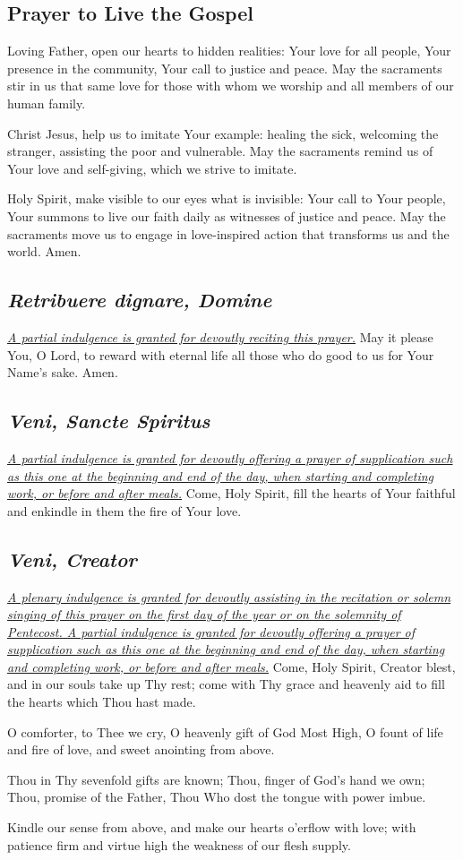 \documentclass[12pt]{article}
\newcommand{\prayertitle}[1]{\subsection{#1}}
\newcommand{\indulgencedprayertitle}[1]{\prayertitle{#1 \protect\kreuz}}
\newcommand{\foreign}[1]{\textsl{#1}}
\newcommand{\note}[1]{{\small{\textsl{#1}}}\newline}
\newcommand{\linkednote}[2]{\hyperlink{#1}{\note{#2}}}
\begin{document}
\prayertitle{Prayer to Live the Gospel}
Loving Father, open our hearts to hidden realities:
Your love for all people,
Your presence in the community,
Your call to justice and peace.
May the sacraments stir in us
that same love for those with whom we worship and all members of our human family.

Christ Jesus, help us to imitate Your example:
healing the sick,
welcoming the stranger,
assisting the poor and vulnerable.
May the sacraments remind us
of Your love and self-giving,
which we strive to imitate.

Holy Spirit, make visible to our eyes what is invisible:
Your call to Your people,
Your summons to live our faith daily
as witnesses of justice and peace.
May the sacraments move us to engage in love-inspired action that transforms us and the world.
Amen.

\indulgencedprayertitle{\foreign{Retribuere dignare, Domine}}
\linkednote{grant24}{A partial indulgence is granted for devoutly reciting this prayer.}
May it please You, O Lord, to reward with eternal life all those who do good to us for Your Name's sake. Amen.

\indulgencedprayertitle{\foreign{Veni, Sancte Spiritus}}
\linkednote{grant26}{A partial indulgence is granted for devoutly offering a prayer of supplication such as this one at the beginning and end of the day, when starting and completing work, or before and after meals.}
Come, Holy Spirit, fill the hearts of Your faithful and enkindle in them the fire of Your love.

\indulgencedprayertitle{\foreign{Veni, Creator}}
\linkednote{grant26}{A plenary indulgence is granted for devoutly assisting in the recitation or solemn singing of this prayer on the first day of the year or on the solemnity of Pentecost.
A partial indulgence is granted for devoutly offering a prayer of supplication such as this one at the beginning and end of the day, when starting and completing work, or before and after meals.}
Come, Holy Spirit, Creator blest,
and in our souls take up Thy rest;
come with Thy grace and heavenly aid
to fill the hearts which Thou hast made.

O comforter, to Thee we cry,
O heavenly gift of God Most High,
O fount of life and fire of love,
and sweet anointing from above.

Thou in Thy sevenfold gifts are known;
Thou, finger of God's hand we own;
Thou, promise of the Father, Thou
Who dost the tongue with power imbue.

Kindle our sense from above,
and make our hearts o'erflow with love;
with patience firm and virtue high
the weakness of our flesh supply.
\end{document}
